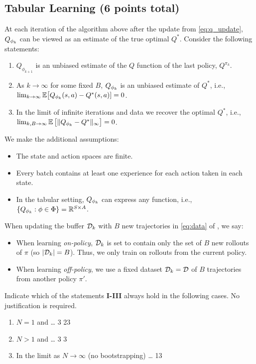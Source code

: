 \documentclass{article}
\newif\ifsolutions
\begin{document}
\subsection{Tabular Learning (6 points total)}
\label{q:tabular_learning}

At each iteration of the algorithm above after the update from \cref{eq:q_update}, $Q_{\phi_k}$ can be viewed as an estimate of the true optimal $Q^*$. Consider the following statements: 
\begin{enumerate}[label=\bf\Roman*.]
  \item $Q_{\phi_{k+1}}$ is an unbiased estimate of the $Q$ function of the last policy, $Q^{\pi_k}$.
  \item As $k\to\infty$ for some fixed $B$, $Q_{\phi_k}$ is an unbiased estimate of $Q^*$, i.e., $\lim_{k\to\infty} \mathbb{E}\bigl[Q_{\phi_k}(s,a)-Q^*(s,a)]=0$.
  \item In the limit of infinite iterations and data we recover the optimal $Q^*$, i.e., $\lim_{k,B\to\infty}\mathbb{E}\,\bigl[\|Q_{\phi_k}-Q^*\|_\infty\bigr]=0$.
\end{enumerate}

We make the additional assumptions: 
\begin{itemize}
	\item The state and action spaces are finite.
	\item Every batch contains at least one experience for each action taken in each state.
	\item In the tabular setting, $Q_{\phi_k}$ can express any function, i.e., $\{Q_{\phi_k}:\phi\in\Phi\}=\mathbb{R}^{S\times A}$.
\end{itemize}
When updating the buffer $\mathcal{D}_k$ with $B$ new trajectories in \cref{eq:data} of , we say:
\begin{itemize}
    \item When learning \textit{on-policy}, $\mathcal{D}_k$ is set to contain only the set of $B$ new rollouts of $\pi$ (so $\lvert \mathcal{D}_k \rvert = B$). Thus, we only train on rollouts from the current policy.
	\item When learning \textit{off-policy}, we use a fixed dataset $\mathcal{D}_k=\mathcal{D}$ of $B$ trajectories from another policy $\pi'$. 
\end{itemize}

Indicate which of the statements \textbf{I-III} always hold in the following cases. No justification is required.
\ifsolutions\solve\thesubsection\else
\begin{enumerate}
\item $N=1$ and \ldots \makecols\ncol\heading\choices
	{3} %
	{23} %
\item $N>1$ and \ldots \choices
	{3} %
	{3} %
\item In the limit as $N\to\infty$ (no bootstrapping) \ldots \choices
	{13} %
	{} %
\end{enumerate}
\fi
\end{document}
